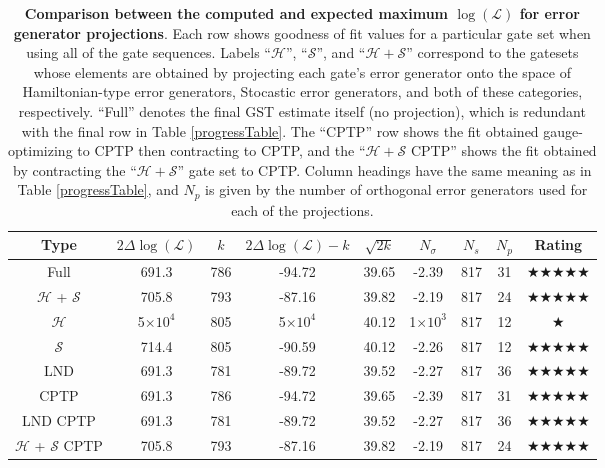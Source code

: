 \documentclass{article}[11pt]
\providecommand{\e}[1]{\ensuremath{\times 10^{#1}}}
\begin{document}
{\begin{table}[h]
\begin{center}
\begin{tabular}[l]{|c|c|c|c|c|c|c|c|c|}
\hline
Type & $2\Delta\log(\mathcal{L})$ & $k$ & $2\Delta\log(\mathcal{L})-k$ & $\sqrt{2k}$ & $N_\sigma$ & $N_s$ & $N_p$ & Rating \\ \hline
Full & 691.3 & 786 & -94.72 & 39.65 & -2.39 & 817 & 31 & $\bigstar\bigstar\bigstar\bigstar\bigstar$ \\ \hline
$\mathcal{H}$ + $\mathcal{S}$ & 705.8 & 793 & -87.16 & 39.82 & -2.19 & 817 & 24 & $\bigstar\bigstar\bigstar\bigstar\bigstar$ \\ \hline
$\mathcal{H}$ & 5\e{4} & 805 & 5\e{4} & 40.12 & 1\e{3} & 817 & 12 & $\bigstar$ \\ \hline
$\mathcal{S}$ & 714.4 & 805 & -90.59 & 40.12 & -2.26 & 817 & 12 & $\bigstar\bigstar\bigstar\bigstar\bigstar$ \\ \hline
LND & 691.3 & 781 & -89.72 & 39.52 & -2.27 & 817 & 36 & $\bigstar\bigstar\bigstar\bigstar\bigstar$ \\ \hline
CPTP & 691.3 & 786 & -94.72 & 39.65 & -2.39 & 817 & 31 & $\bigstar\bigstar\bigstar\bigstar\bigstar$ \\ \hline
LND CPTP & 691.3 & 781 & -89.72 & 39.52 & -2.27 & 817 & 36 & $\bigstar\bigstar\bigstar\bigstar\bigstar$ \\ \hline
$\mathcal{H}$ + $\mathcal{S}$ CPTP & 705.8 & 793 & -87.16 & 39.82 & -2.19 & 817 & 24 & $\bigstar\bigstar\bigstar\bigstar\bigstar$ \\ \hline
\end{tabular}

\caption{\textbf{Comparison between the computed and expected maximum $\log(\mathcal{L})$ for error generator projections}.  Each row shows goodness of fit values for a particular gate set when using all of the gate sequences.  Labels ``$\mathcal{H}$'', ``$\mathcal{S}$'', and ``$\mathcal{H} + \mathcal{S}$'' correspond to the gatesets whose elements are obtained by projecting each gate's error generator onto the space of Hamiltonian-type error generators, Stocastic error generators, and both of these categories, respectively. ``Full'' denotes the final GST estimate itself (no projection), which is redundant with the final row in Table \ref{progressTable}.  The ``CPTP'' row shows the fit obtained gauge-optimizing to CPTP then contracting to CPTP, and the ``$\mathcal{H} + \mathcal{S}$ CPTP'' shows the fit obtained by contracting the ``$\mathcal{H} + \mathcal{S}$'' gate set to CPTP.  Column headings have the same meaning as in Table \ref{progressTable}, and $N_p$ is given by the number of orthogonal error generators used for each of the projections.\label{logLErrgenProjectionTable}}
\end{center}
\end{table}


}
\end{document}
